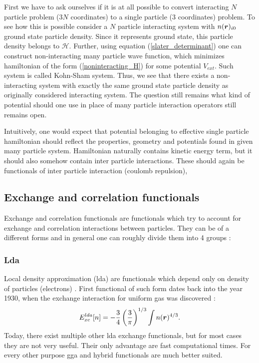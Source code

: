 \documentclass[openany, longbibliography,slovene,a4paper,12pt]{article}
\def\vec#1{\mbox{\boldmath$#1$}}
\begin{document}
First we have to ask ourselves if it is at all possible to convert interacting
$N$ particle problem ($3N$ coordinates) to a single particle (3 coordinates)
problem. To see how this is possible consider a $N$ particle interacting system
with $n(\vec r)_{i0}$ ground state particle density. Since it represents ground
state,  this particle density belongs to $\mathcal H$. Further, using equation
(\ref{slater_determinant}) one can construct non-interacting many particle wave
function, which minimizes hamiltonian of the form (\ref{noninteracting_H})
for some potential $V_{ext}$. Such system is called Kohn-Sham system.
Thus, we see that there exists a non-interacting system with exactly the same ground state particle density as originally
considered interacting system. The question still remains what kind of potential
should one use in place of many particle interaction operators still remains
open.

Intuitively, one would expect that potential belonging to effective single
particle hamiltonian should reflect the properties, geometry and potentials found
in given many particle system. Hamiltonian naturally contains kinetic energy
term, but it should also somehow contain inter particle interactions. These
should again be functionals of  
inter particle interaction (coulomb repulsion), 

\subsection{Exchange and correlation functionals}
Exchange and correlation functionals are functionals which try to account for
exchange and correlation interactions between particles. They can be of a
different forms and in general one can roughly divide them into 4 groups \cite{challenges_den_fun_theor}:

\subsubsection{Lda}
Local density approximation (lda) are functionals which depend only on
density of particles (electrons) \cite{challenges_den_fun_theor}.
First functional of such form dates back into
the year 1930, when the exchange interaction for uniform gas was discovered \cite{challenges_den_fun_theor}:
\begin{equation} \label{electron_gas_exchange}
E_{xc}^{lda}[n]=-\frac{3}{4}\left( \frac{3}{\pi} \right)^{1/3}\int n(\vec r)^{4/3}.
\end{equation}
Today, there exist multiple other lda exchange functionals, but for most cases
they are not very useful. Their only advantage are fast computational times.
For every other purpose gga and hybrid functionals are much better suited.
\end{document}
